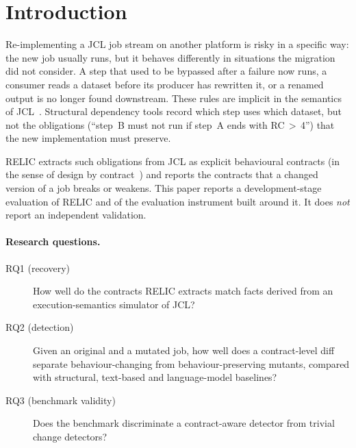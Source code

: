 \section{Introduction}
\label{sec:intro}

Re-implementing a JCL job stream on another platform is risky in a specific
way: the new job usually runs, but it behaves differently in situations the
migration did not consider. A step that used to be bypassed after a failure now
runs, a consumer reads a dataset before its producer has rewritten it, or a
renamed output is no longer found downstream. These rules are implicit in the
semantics of JCL~\cite{ibm_jcl_reference}. Structural dependency tools record
which step uses which dataset, but not the obligations (``step~B must not run if
step~A ends with RC\,$>$\,4'') that the new implementation must preserve.

RELIC extracts such obligations from JCL as explicit behavioural contracts
(in the sense of design by contract~\cite{meyer1992applying}) and reports the
contracts that a changed version of a job breaks or weakens. This paper reports
a development-stage evaluation of RELIC and of the evaluation instrument built
around it. It does \emph{not} report an independent validation.

\paragraph{Research questions.}
\begin{description}
  \item[RQ1 (recovery)] How well do the contracts RELIC extracts match facts
    derived from an execution-semantics simulator of JCL?
  \item[RQ2 (detection)] Given an original and a mutated job, how well does a
    contract-level diff separate behaviour-changing from behaviour-preserving
    mutants, compared with structural, text-based and language-model baselines?
  \item[RQ3 (benchmark validity)] Does the benchmark discriminate a
    contract-aware detector from trivial change detectors?
\end{description}

